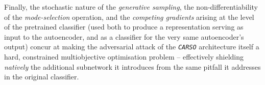 Finally, the stochastic nature of the \textit{generative sampling}, the non-differentiability of the \textit{mode-selection} operation, and the \textit{competing gradients} arising at the level of the pretrained classifier (used both to produce a representation serving as input to the autoencoder, and as a classifier for the very same autoencoder’s output) concur at making the adversarial attack of the \textit{\texttt{CARSO}} architecture itself a hard, constrained multiobjective optimisation problem – effectively shielding \textit{natively} the additional subnetwork it introduces from the same pitfall it addresses in the original classifier.